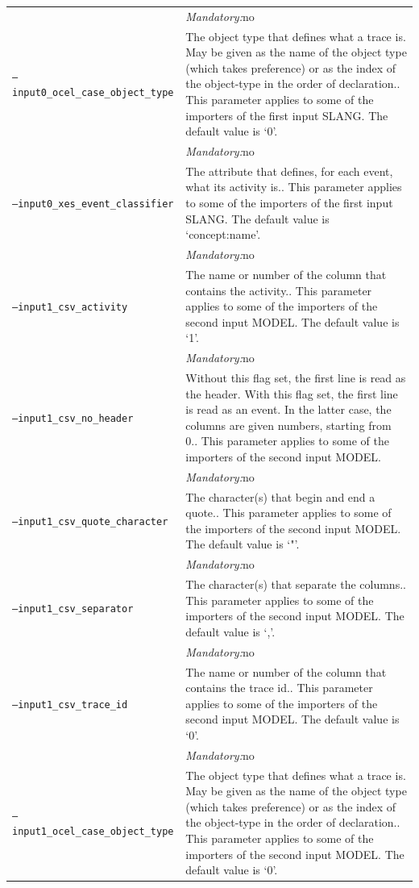 {\begin{tabularx}{\linewidth}{lX}
&\textit{Mandatory:}\quad no\\
\texttt{--input0\_ocel\_case\_object\_type} & The object type that defines what a trace is. May be given as the name of the object type (which takes preference) or as the index of the object-type in the order of declaration.. This parameter applies to some of the importers of the first input SLANG. The default value is `0'.\\
&\textit{Mandatory:}\quad no\\
\texttt{--input0\_xes\_event\_classifier} & The attribute that defines, for each event, what its activity is.. This parameter applies to some of the importers of the first input SLANG. The default value is `concept:name'.\\
&\textit{Mandatory:}\quad no\\
\texttt{--input1\_csv\_activity} & The name or number of the column that contains the activity.. This parameter applies to some of the importers of the second input MODEL. The default value is `1'.\\
&\textit{Mandatory:}\quad no\\
\texttt{--input1\_csv\_no\_header} & Without this flag set, the first line is read as the header. 
    With this flag set, the first line is read as an event. In the latter case, the columns are given numbers, starting from 0.. This parameter applies to some of the importers of the second input MODEL. \\
&\textit{Mandatory:}\quad no\\
\texttt{--input1\_csv\_quote\_character} & The character(s) that begin and end a quote.. This parameter applies to some of the importers of the second input MODEL. The default value is `"'.\\
&\textit{Mandatory:}\quad no\\
\texttt{--input1\_csv\_separator} & The character(s) that separate the columns.. This parameter applies to some of the importers of the second input MODEL. The default value is `,'.\\
&\textit{Mandatory:}\quad no\\
\texttt{--input1\_csv\_trace\_id} & The name or number of the column that contains the trace id.. This parameter applies to some of the importers of the second input MODEL. The default value is `0'.\\
&\textit{Mandatory:}\quad no\\
\texttt{--input1\_ocel\_case\_object\_type} & The object type that defines what a trace is. May be given as the name of the object type (which takes preference) or as the index of the object-type in the order of declaration.. This parameter applies to some of the importers of the second input MODEL. The default value is `0'.\\

\end{tabularx}}
